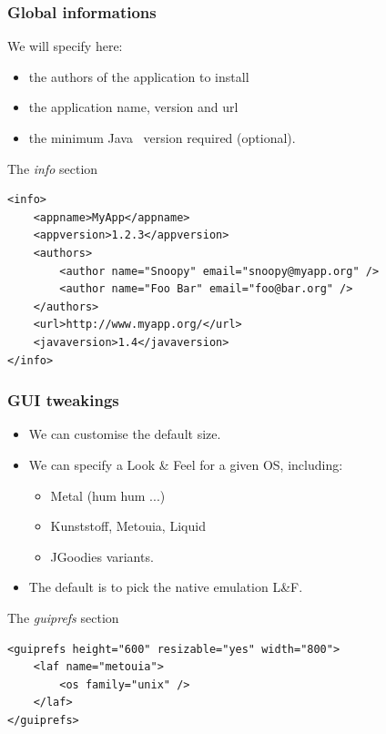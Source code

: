 \documentclass[compress,10pt]{beamer}
\begin{document}

\begin{frame}[containsverbatim]

\frametitle{Global informations}

We will specify here:
  \begin{itemize}
      \item the authors of the application to install
      \item the application name, version and url
      \item the minimum Java\texttrademark~ version required (optional).
  \end{itemize}

\begin{block}{The \textsl{info} section}
\tiny
\begin{verbatim}
<info>
    <appname>MyApp</appname>
    <appversion>1.2.3</appversion>
    <authors>
        <author name="Snoopy" email="snoopy@myapp.org" />
        <author name="Foo Bar" email="foo@bar.org" />
    </authors>
    <url>http://www.myapp.org/</url>
    <javaversion>1.4</javaversion>
</info>
\end{verbatim}
\end{block}

\end{frame}


\begin{frame}[containsverbatim]

\frametitle{GUI tweakings}

\begin{itemize}

  \item We can customise the default size.

  \item We can specify a Look \& Feel for a given OS, including:
    \begin{itemize}
      \item Metal (hum hum ...)
      \item Kunststoff, Metouia, Liquid
      \item JGoodies variants.
    \end{itemize}

  \item The default is to pick the native emulation L\&F.

\end{itemize}

\begin{block}{The \textsl{guiprefs} section}
\tiny
\begin{verbatim}
<guiprefs height="600" resizable="yes" width="800">
    <laf name="metouia">
        <os family="unix" />
    </laf>
</guiprefs>
\end{verbatim}
\end{block}

\end{frame}
\end{document}
